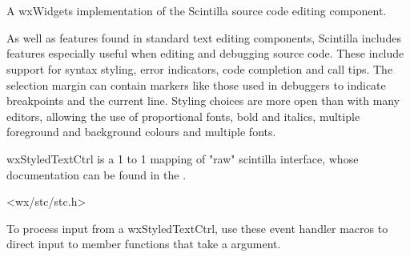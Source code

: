 
\section{}\label{wxstyledtextctrl}

A wxWidgets implementation of the Scintilla source code editing component.

As well as features found in standard text editing components, Scintilla includes 
features especially useful when editing and debugging source code. These include 
support for syntax styling, error indicators, code completion and call tips. The 
selection margin can contain markers like those used in debuggers to indicate 
breakpoints and the current line. Styling choices are more open than with many 
editors, allowing the use of proportional fonts, bold and italics, multiple 
foreground and background colours and multiple fonts.

wxStyledTextCtrl is a 1 to 1 mapping of "raw" scintilla interface, whose documentation
can be found in the .




<wx/stc/stc.h>




To process input from a wxStyledTextCtrl, use these event handler macros to direct input to member
functions that take a  argument.

